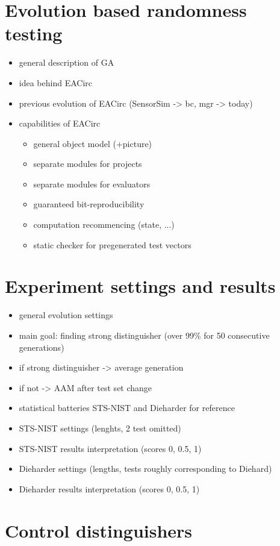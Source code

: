 \documentclass[12pt,oneside]{fithesis2}
\begin{document}
\chapter{Evolution based randomness testing}
\label{chap:evo-based-testing}
\begin{itemize}
\item general description of GA
\item idea behind EACirc
\item previous evolution of EACirc (SensorSim -> bc, mgr -> today)
\item capabilities of EACirc
\begin{itemize}
\item general object model (+picture)
\item separate modules for projects
\item separate modules for evaluators
\item guaranteed bit-reproducibility
\item computation recommencing (state, ...)
\item static checker for pregenerated test vectors
\end{itemize}
\end{itemize}

\chapter{Experiment settings and results}
\label{chap:settings-results}

\begin{itemize}
\item general evolution settings
\item main goal: finding strong distinguisher (over 99\% for 50 consecutive generations)
\item if strong distinguisher -> average generation
\item if not -> AAM after test set change
\item statistical batteries STS-NIST and Dieharder for reference
\item STS-NIST settings (lenghts, 2 test omitted)
\item STS-NIST results interpretation (scores 0, 0.5, 1)
\item Dieharder settings (lengths, tests roughly corresponding to Diehard)
\item Dieharder results interpretation (scores 0, 0.5, 1)
\end{itemize}

\chapter{Control distinguishers}
\label{chap:distinguish-control}
\end{document}
